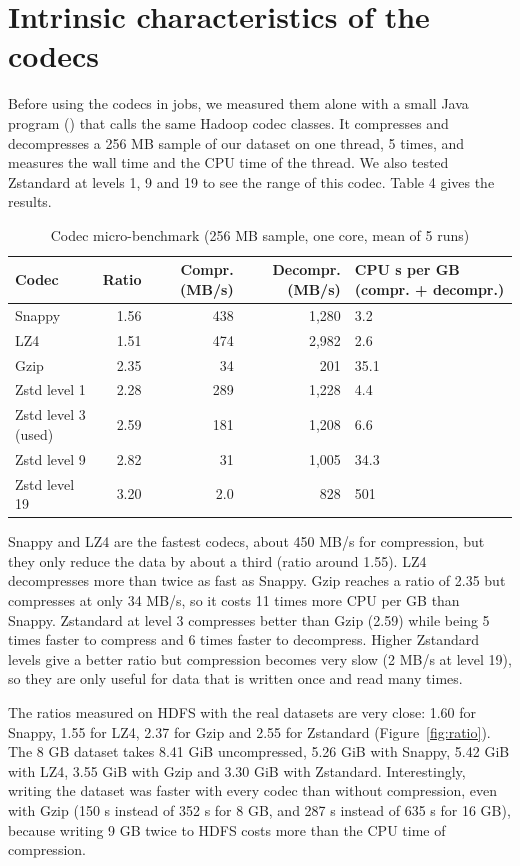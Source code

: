\documentclass[11pt,a4paper]{article}
\begin{document}
\section{Intrinsic characteristics of the codecs}
Before using the codecs in jobs, we measured them alone with a small Java program () that calls the same Hadoop codec classes. It compresses and decompresses a 256 MB sample of our dataset on one thread, 5 times, and measures the wall time and the CPU time of the thread. We also tested Zstandard at levels 1, 9 and 19 to see the range of this codec. Table 4 gives the results.

\begin{table}[H]
  \centering
  \small
  \caption{Codec micro-benchmark (256 MB sample, one core, mean of 5 runs)}
  \begin{tabularx}{\linewidth}{lrrrX}
  \toprule
  \textbf{Codec} & \textbf{Ratio} & \textbf{Compr. (MB/s)} & \textbf{Decompr. (MB/s)} & \textbf{CPU s per GB (compr. + decompr.)} \\
  \midrule
  Snappy & 1.56 & 438 & 1,280 & 3.2 \\
  LZ4 & 1.51 & 474 & 2,982 & 2.6 \\
  Gzip & 2.35 & 34 & 201 & 35.1 \\
  Zstd level 1 & 2.28 & 289 & 1,228 & 4.4 \\
  Zstd level 3 (used) & 2.59 & 181 & 1,208 & 6.6 \\
  Zstd level 9 & 2.82 & 31 & 1,005 & 34.3 \\
  Zstd level 19 & 3.20 & 2.0 & 828 & 501 \\
  \bottomrule
  \end{tabularx}
\end{table}

Snappy and LZ4 are the fastest codecs, about 450 MB/s for compression, but they only reduce the data by about a third (ratio around 1.55). LZ4 decompresses more than twice as fast as Snappy. Gzip reaches a ratio of 2.35 but compresses at only 34 MB/s, so it costs 11 times more CPU per GB than Snappy. Zstandard at level 3 compresses better than Gzip (2.59) while being 5 times faster to compress and 6 times faster to decompress. Higher Zstandard levels give a better ratio but compression becomes very slow (2 MB/s at level 19), so they are only useful for data that is written once and read many times.

The ratios measured on HDFS with the real datasets are very close: 1.60 for Snappy, 1.55 for LZ4, 2.37 for Gzip and 2.55 for Zstandard (Figure~\ref{fig:ratio}). The 8 GB dataset takes 8.41 GiB uncompressed, 5.26 GiB with Snappy, 5.42 GiB with LZ4, 3.55 GiB with Gzip and 3.30 GiB with Zstandard. Interestingly, writing the dataset was faster with every codec than without compression, even with Gzip (150 s instead of 352 s for 8 GB, and 287 s instead of 635 s for 16 GB), because writing 9 GB twice to HDFS costs more than the CPU time of compression.
\end{document}
